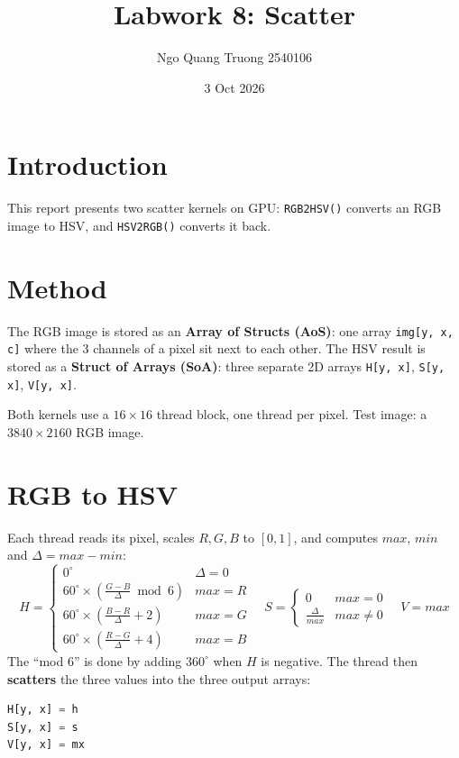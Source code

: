 \documentclass[12pt]{article}
\title{Labwork 8: Scatter}
\author{Ngo Quang Truong 2540106}
\date{3 Oct 2026}
\begin{document}
\maketitle
\newpage

\section{Introduction}
This report presents two scatter kernels on GPU: \texttt{RGB2HSV()} converts an RGB image to HSV, and \texttt{HSV2RGB()} converts it back.

\section{Method}
The RGB image is stored as an \textbf{Array of Structs (AoS)}: one array \texttt{img[y, x, c]} where the 3 channels of a pixel sit next to each other. The HSV result is stored as a \textbf{Struct of Arrays (SoA)}: three separate 2D arrays \texttt{H[y, x]}, \texttt{S[y, x]}, \texttt{V[y, x]}.

Both kernels use a $16\times16$ thread block, one thread per pixel. Test image: a $3840\times2160$ RGB image.

\section{RGB to HSV}
Each thread reads its pixel, scales $R, G, B$ to $[0, 1]$, and computes $max$, $min$ and $\Delta = max - min$:
\begin{equation}
H = \begin{cases}
0^\circ & \Delta = 0 \\
60^\circ \times (\frac{G-B}{\Delta} \bmod 6) & max = R \\
60^\circ \times (\frac{B-R}{\Delta} + 2) & max = G \\
60^\circ \times (\frac{R-G}{\Delta} + 4) & max = B
\end{cases}
\quad
S = \begin{cases} 0 & max = 0 \\ \frac{\Delta}{max} & max \neq 0 \end{cases}
\quad
V = max
\end{equation}
The ``mod 6'' is done by adding $360^\circ$ when $H$ is negative. The thread then \textbf{scatters} the three values into the three output arrays:
\begin{lstlisting}[language=Python, basicstyle=\ttfamily\small]
H[y, x] = h
S[y, x] = s
V[y, x] = mx
\end{lstlisting}
\end{document}
